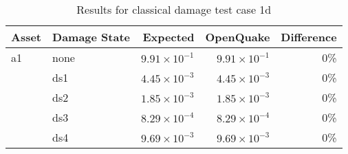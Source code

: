 \begin{table}[htbp]

\centering
\begin{tabular}{ l l r r r }

\hline
\rowcolor{anti-flashwhite}
\bf{Asset} & \bf{Damage State} & \bf{Expected} & \bf{OpenQuake} & \bf{Difference}\\
\hline
a1 & none & $9.91 \times 10^{-1}$ & $9.91 \times 10^{-1}$ & 0\% \\
   & ds1 & $4.45 \times 10^{-3}$ & $4.45 \times 10^{-3}$ & 0\% \\
   & ds2 & $1.85 \times 10^{-3}$ & $1.85 \times 10^{-3}$ & 0\% \\
   & ds3 & $8.29 \times 10^{-4}$ & $8.29 \times 10^{-4}$ & 0\% \\
   & ds4 & $9.69 \times 10^{-3}$ & $9.69 \times 10^{-3}$ & 0\% \\
\hline
\end{tabular}

\caption{Results for classical damage test case 1d}
\label{tab:result-cd-1d}
\end{table}